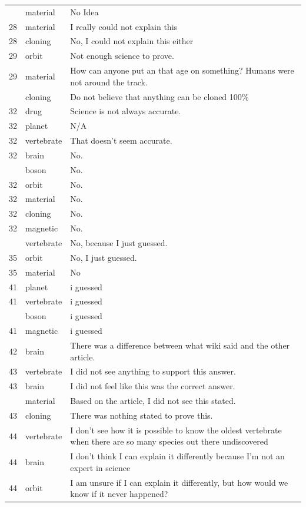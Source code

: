 \documentclass[
  doc,floatsintext]{apa6}
\begin{document}
\begin{longtable}[t]{>{}r>{}l>{\raggedright\arraybackslash}p{30em}}
\addlinespace
26 & material & No Idea\\
28 & material & I really could not explain this\\
28 & cloning & No, I could not explain this either\\
29 & orbit & Not enough science to prove.\\
29 & material & How can anyone put an  that age on something? Humans were not around the track.\\
\addlinespace
29 & cloning & Do not believe that anything can be cloned 100\%\\
32 & drug & Science is not always accurate.\\
32 & planet & N/A\\
32 & vertebrate & That doesn't seem accurate.\\
32 & brain & No.\\
\addlinespace
32 & boson & No.\\
32 & orbit & No.\\
32 & material & No.\\
32 & cloning & No.\\
32 & magnetic & No.\\
\addlinespace
35 & vertebrate & No, because I just guessed.\\
35 & orbit & No, I just guessed.\\
35 & material & No\\
41 & planet & i guessed\\
41 & vertebrate & i guessed\\
\addlinespace
41 & boson & i guessed\\
41 & magnetic & i guessed\\
42 & brain & There was a difference between what wiki said and the other article.\\
43 & vertebrate & I did not see anything to support this answer.\\
43 & brain & I did not feel like this was the correct answer.\\
\addlinespace
43 & material & Based on the article, I did not see this stated.\\
43 & cloning & There was nothing stated to prove this.\\
44 & vertebrate & I don’t see how it is possible to know the oldest vertebrate when there are so many species out there undiscovered\\
44 & brain & I don’t think I can explain it differently because I’m not an expert in science\\
44 & orbit & I am unsure if I can explain it differently, but how would we know if it never happened?\\

\end{longtable}
\end{document}
